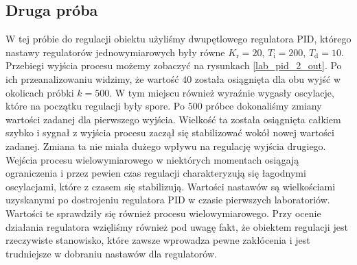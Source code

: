 \subsection{Druga próba}
\label{thermal_pid_proba_2}
W tej próbie do regulacji obiektu użyliśmy dwupętlowego regulatora PID, którego nastawy regulatorów jednowymiarowych były równe $K_{\mathrm{r}} = 20$, $T_{\mathrm{i}} = 200$, $ T_{\mathrm{d}} = 10$. Przebiegi wyjścia procesu możemy zobaczyć na rysunkach \ref{lab_pid_2_out}. Po ich przeanalizowaniu widzimy, że wartość $40$ została osiągnięta dla obu wyjść w okolicach próbki $k=500$. W tym miejscu również wyraźnie wygasły oscylacje, które na początku regulacji były spore. Po $500$ próbce dokonaliśmy zmiany wartości zadanej dla pierwszego wyjścia. Wielkość ta została osiągnięta całkiem szybko i sygnał z wyjścia procesu zaczął się stabilizować wokół nowej wartości zadanej. Zmiana ta nie miała dużego wpływu na regulację wyjścia drugiego. Wejścia procesu wielowymiarowego w niektórych momentach osiągają ograniczenia i przez pewien czas regulacji charakteryzują się łagodnymi oscylacjami, które z czasem się stabilizują. Wartości nastawów są wielkościami uzyskanymi po dostrojeniu regulatora PID w czasie pierwszych laboratoriów. Wartości te sprawdziły się również procesu wielowymiarowego. Przy ocenie działania regulatora wzięliśmy również pod uwagę fakt, że obiektem regulacji jest rzeczywiste stanowisko, które zawsze wprowadza pewne zakłócenia i jest trudniejsze w dobraniu nastawów dla regulatorów. 


